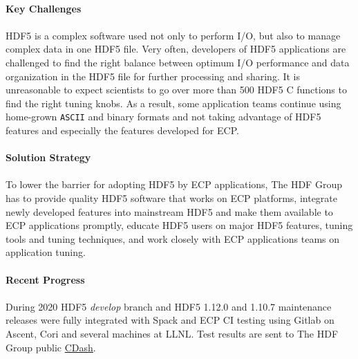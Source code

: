 \paragraph{Key  Challenges}
\paragraph{}

HDF5 is a complex software used not only to perform I/O, but also to manage complex data in one HDF5 file. Very often, developers of HDF5 applications are challenged to find the right balance between optimum I/O performance and data organization in the HDF5 file for further processing and sharing. It is unreasonable to expect scientists to go over more than 500 HDF5 C functions to find the right tuning knobs. As a result, some application teams continue using home-grown \texttt{ASCII} and binary formats and not taking advantage of HDF5 features and especially the features developed for ECP.    

\paragraph{Solution Strategy}
\paragraph{}
To lower the barrier for adopting HDF5 by ECP applications, The HDF Group has to provide quality HDF5 software that works on ECP platforms, integrate newly developed features into mainstream HDF5 and make them available to ECP applications promptly, educate HDF5 users on major HDF5 features, tuning tools and tuning techniques, and work closely with ECP applications teams on application tuning.

\paragraph{Recent Progress}
\paragraph{}
During 2020 HDF5 \textit{develop} branch and HDF5 1.12.0 and 1.10.7 maintenance releases were fully integrated with Spack and ECP CI testing using Gitlab on Ascent, Cori and several machines at LLNL.  Test results are sent to The HDF Group public \href{cdash.hdfgroup.org} {CDash}.  

